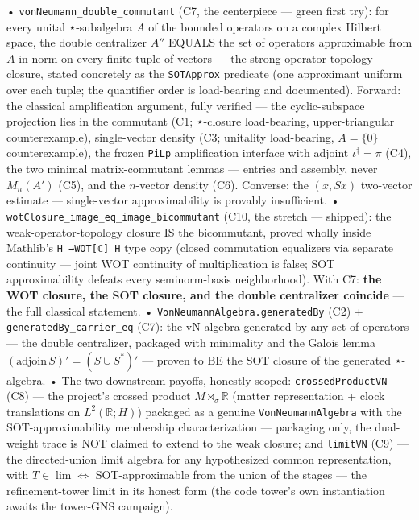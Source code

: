 \documentclass[11pt,a4paper]{article}
\begin{document}
  • \texttt{vonNeumann\_double\_commutant} (C7, the centerpiece — green first try): for every unital ⋆-subalgebra $A$ of the bounded operators on a complex Hilbert space, the double centralizer $A''$ EQUALS the set of operators approximable from $A$ in norm on every finite tuple of vectors — the strong-operator-topology closure, stated concretely as the \texttt{SOTApprox} predicate (one approximant uniform over each tuple; the quantifier order is load-bearing and documented). Forward: the classical amplification argument, fully verified — the cyclic-subspace projection lies in the commutant (C1; ⋆-closure load-bearing, upper-triangular counterexample), single-vector density (C3; unitality load-bearing, $A=\{0\}$ counterexample), the frozen \texttt{PiLp} amplification interface with adjoint $\iota^\dagger = \pi$ (C4), the two minimal matrix-commutant lemmas — entries and assembly, never $M_n(A')$ (C5), and the $n$-vector density (C6). Converse: the $(x, Sx)$ two-vector estimate — single-vector approximability is provably insufficient.
  • \texttt{wotClosure\_image\_eq\_image\_bicommutant} (C10, the stretch — shipped): the weak-operator-topology closure IS the bicommutant, proved wholly inside Mathlib's \texttt{H →WOT[ℂ] H} type copy (closed commutation equalizers via separate continuity — joint WOT continuity of multiplication is false; SOT approximability defeats every seminorm-basis neighborhood). With C7: \textbf{the WOT closure, the SOT closure, and the double centralizer coincide} — the full classical statement.
  • \texttt{VonNeumannAlgebra.generatedBy} (C2) + \texttt{generatedBy\_carrier\_eq} (C7): the vN algebra generated by any set of operators — the double centralizer, packaged with minimality and the Galois lemma $(\mathrm{adjoin}\,S)' = (S \cup S^*)'$ — proven to BE the SOT closure of the generated ⋆-algebra.
  • The two downstream payoffs, honestly scoped: \texttt{crossedProductVN} (C8) — the project's crossed product $M \rtimes_\sigma \mathbb{R}$ (matter representation + clock translations on $L^2(\mathbb{R};H)$) packaged as a genuine \texttt{VonNeumannAlgebra} with the SOT-approximability membership characterization — packaging only, the dual-weight trace is NOT claimed to extend to the weak closure; and \texttt{limitVN} (C9) — the directed-union limit algebra for any hypothesized common representation, with $T \in \lim \Leftrightarrow$ SOT-approximable from the union of the stages — the refinement-tower limit in its honest form (the code tower's own instantiation awaits the tower-GNS campaign).
\end{document}
